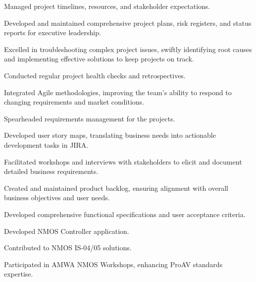 \documentclass[]{private}
\begin{document}
\begin{paracol}{2}
    \begin{tightemize}
        \item Managed project timelines, resources, and stakeholder expectations.
        \item Developed and maintained comprehensive project plans, risk registers, and status reports for executive leadership.
        \item Excelled in troubleshooting complex project issues, swiftly identifying root causes and implementing effective solutions to keep projects on track.
        \item Conducted regular project health checks and retrospectives.
        \item Integrated Agile methodologies, improving the team's ability to respond to changing requirements and market conditions.
    \end{tightemize}
    \sectionsep

    \begin{tightemize}
        \item Spearheaded requirements management for the projects.
        \item Developed user story maps, translating business needs into actionable development tasks in JIRA.
        \item Facilitated workshops and interviews with stakeholders to elicit and document detailed business requirements.
        \item Created and maintained product backlog, ensuring alignment with overall business objectives and user needs.
        \item Developed comprehensive functional specifications and user acceptance criteria.
    \end{tightemize}
    \sectionsep

    \begin{tightemize}
        \item Developed NMOS Controller application.
        \item Contributed to NMOS IS-04/05 solutions.
        \item Participated in AMWA NMOS Workshops, enhancing ProAV standards expertise.
    \end{tightemize}
    \sectionsep


\end{paracol}
\end{document}

